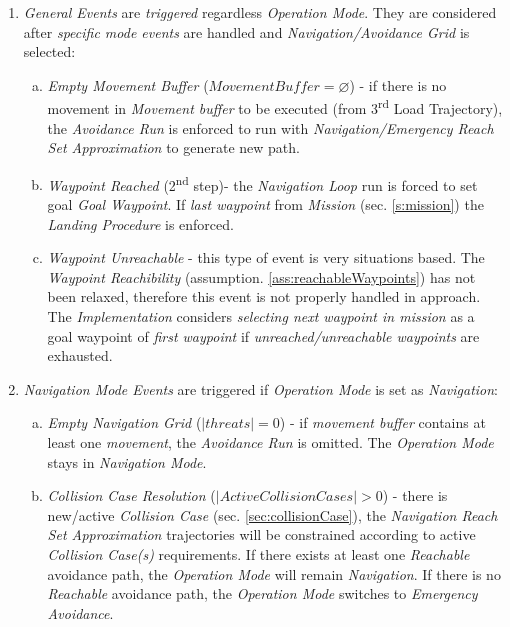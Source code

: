 \begin{enumerate}
    \item \emph{General Events} are \emph{triggered} regardless \emph{Operation Mode}. They are considered after \emph{specific mode events} are handled and \emph{Navigation/Avoidance Grid} is selected:
    \begin{enumerate}[a.]
        \item \emph{Empty Movement Buffer} ($Movement Buffer = \varnothing$) - if there is no movement in \emph{Movement buffer} to be executed (from 3\textsuperscript{rd} Load Trajectory), the \emph{Avoidance Run} is enforced to run with \emph{Navigation/Emergency Reach Set Approximation} to generate new path.
        
        \item \emph{Waypoint Reached} (2\textsuperscript{nd} step)- the \emph{Navigation Loop} run is forced to set goal \emph{Goal Waypoint}. If \emph{last waypoint} from \emph{Mission} (sec. \ref{s:mission}) the \emph{Landing Procedure} is enforced.
        
        \item \emph{Waypoint Unreachable} - this type of event is very situations based. The \emph{Waypoint Reachibility} (assumption. \ref{ass:reachableWaypoints}) has not been relaxed, therefore this event is not properly handled in approach. The \emph{Implementation} considers \emph{selecting next waypoint in mission} as a goal waypoint of \emph{first waypoint} if \emph{unreached/unreachable waypoints} are exhausted. 
    \end{enumerate}
    
    \item \emph{Navigation Mode Events} are triggered if \emph{Operation Mode} is set as \emph{Navigation}:
    \begin{enumerate}[a.]
        \item \emph{Empty Navigation Grid} ($|threats| = 0$) - if \emph{movement buffer} contains at least one \emph{movement}, the \emph{Avoidance Run} is omitted. The \emph{Operation Mode} stays in \emph{Navigation Mode}.
        
        \item \emph{Collision Case Resolution} ($|ActiveCollisionCases| > 0$) - there is new/active \emph{Collision Case} (sec. \ref{sec:collisionCase}), the \emph{Navigation Reach Set Approximation} trajectories will be constrained according to  active \emph{Collision Case(s)} requirements. If there exists at least one \emph{Reachable} avoidance path, the \emph{Operation Mode} will remain \emph{Navigation}. If there is no  \emph{Reachable} avoidance path, the \emph{Operation Mode} switches to \emph{Emergency Avoidance}.
        

\end{enumerate}
\end{enumerate}
